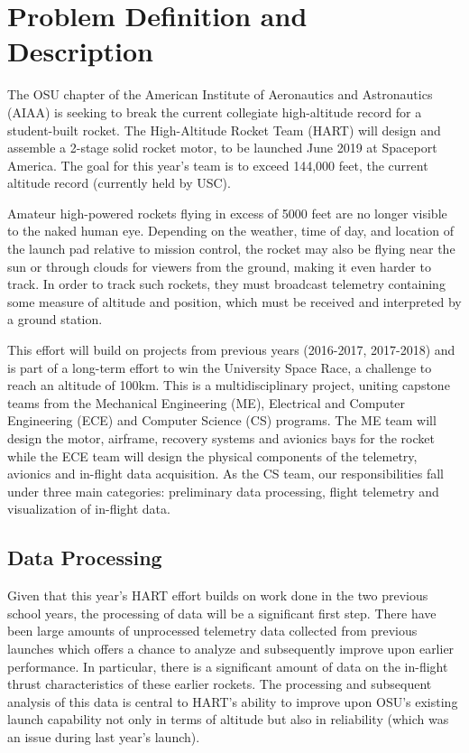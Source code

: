 \documentclass[onecolumn, draftclsnofoot,10pt, compsoc]{IEEEtran}
\begin{document}
\newpage
{}
\tableofcontents
\clearpage

\section{Problem Definition and Description}

The OSU chapter of the American Institute of Aeronautics and Astronautics (AIAA) is seeking to break the current collegiate high-altitude record for a student-built rocket. 
The High-Altitude Rocket Team (HART) will design and assemble a 2-stage solid rocket motor, to be launched June 2019 at Spaceport America. 
The goal for this year's team is to exceed 144,000 feet, the current altitude record (currently held by USC).

Amateur high-powered rockets flying in excess of 5000 feet are no longer visible to the naked human eye. 
Depending on the weather, time of day, and location of the launch pad relative to mission control, the rocket may also be flying near the sun or through clouds for viewers from the ground, making it even harder to track. 
In order to track such rockets, they must broadcast telemetry containing some measure of altitude and position, which must be received and interpreted by a ground station.  

This effort will build on projects from previous years (2016-2017, 2017-2018) and is part of a long-term effort to win the University Space Race, a challenge to reach an altitude of 100km. 
This is a multidisciplinary project, uniting capstone teams from the Mechanical Engineering (ME), Electrical and Computer Engineering (ECE) and Computer Science (CS) programs. 
The ME team will design the motor, airframe, recovery systems and avionics bays for the rocket while the ECE team will design the physical components of the telemetry, avionics and in-flight data acquisition. 
As the CS team, our responsibilities fall under three main categories: preliminary data processing, flight telemetry and visualization of in-flight data.

\subsection{Data Processing}
Given that this year's HART effort builds on work done in the two previous school years, the processing of data will be a significant first step. 
There have been large amounts of unprocessed telemetry data collected from previous launches which offers a chance to analyze and subsequently improve upon earlier performance. 
In particular, there is a significant amount of data on the in-flight thrust characteristics of these earlier rockets. 
The processing and subsequent analysis of this data is central to HART's ability to improve upon OSU's existing launch capability not only in terms of altitude but also in reliability (which was an issue during last year's launch).
\end{document}
